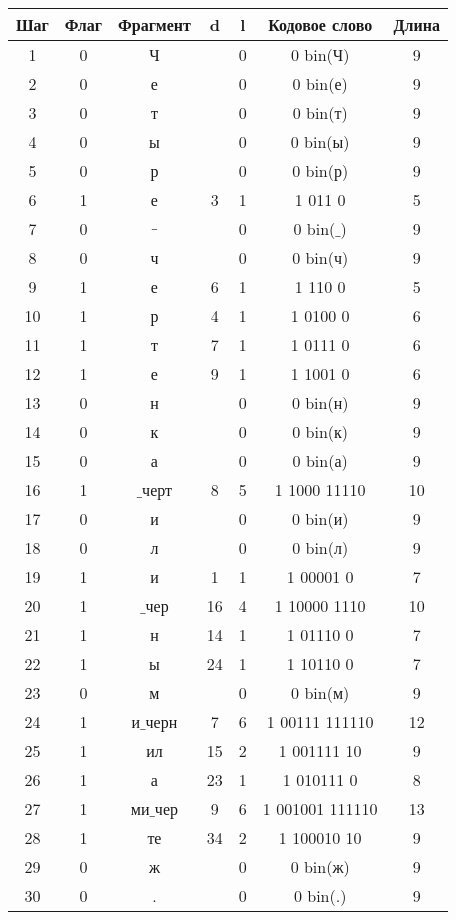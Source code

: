 \begin{tabular}{|c|c|c|c|c|c|c|}
\hline
Шаг & Флаг & Фрагмент & d & l & Кодовое слово & Длина\\
\hline
1 & 0 & Ч &  & 0 & 0 bin(Ч) & 9\\
\hline
2 & 0 & е &  & 0 & 0 bin(е) & 9\\
\hline
3 & 0 & т &  & 0 & 0 bin(т) & 9\\
\hline
4 & 0 & ы &  & 0 & 0 bin(ы) & 9\\
\hline
5 & 0 & р &  & 0 & 0 bin(р) & 9\\
\hline
6 & 1 & е & 3 & 1 & 1 011 0 & 5\\
\hline
7 & 0 & $\_$ &  & 0 & 0 bin($\_$) & 9\\
\hline
8 & 0 & ч &  & 0 & 0 bin(ч) & 9\\
\hline
9 & 1 & е & 6 & 1 & 1 110 0 & 5\\
\hline
10 & 1  & р & 4 & 1 & 1 0100 0 & 6\\
\hline
11 & 1 & т & 7 & 1 & 1 0111 0 & 6\\
\hline
12 & 1 & е & 9 & 1 & 1 1001 0 & 6\\
\hline
13 & 0 & н &  & 0 & 0 bin(н) & 9\\
\hline
14 & 0 & к &  & 0 & 0 bin(к) & 9\\
\hline
15 & 0 & а &  & 0 & 0 bin(а) & 9\\
\hline
16 & 1 & $\_$черт & 8 & 5 & 1 1000 11110 & 10\\
\hline
17 & 0 & и &  & 0 & 0 bin(и) & 9\\
\hline
18 & 0 & л &  & 0 & 0 bin(л) & 9\\
\hline
19 & 1 & и & 1 & 1 & 1 00001 0 & 7\\
\hline
20 & 1 & $\_$чер & 16 & 4 & 1 10000 1110 & 10\\
\hline
21 & 1 & н & 14 & 1 & 1 01110 0 & 7\\
\hline
22 & 1 & ы & 24 & 1 & 1 10110 0 & 7\\
\hline
23 & 0 & м &  & 0 & 0 bin(м) & 9\\
\hline
24 & 1 & и$\_$черн & 7 & 6 & 1 00111 111110 & 12\\
\hline
25 & 1 & ил & 15 & 2 & 1 001111 10 & 9\\
\hline
26 & 1 & а & 23 & 1 & 1 010111 0 & 8\\
\hline
27 & 1 & ми$\_$чер & 9 & 6 & 1 001001 111110 & 13\\
\hline
28 & 1 & те & 34 & 2 & 1 100010 10 & 9\\
\hline
29 & 0 & ж &  & 0 & 0 bin(ж) & 9\\
\hline
30 & 0 & . &  & 0 & 0 bin(.) & 9\\
\hline
\end{tabular}

